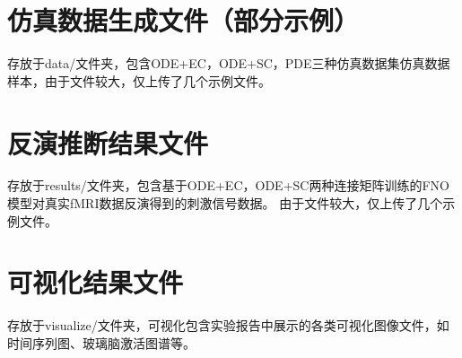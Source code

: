 \documentclass[12pt,a4paper]{article}
\begin{document}
\section{仿真数据生成文件（部分示例）}
存放于data/文件夹，包含ODE+EC，ODE+SC，PDE三种仿真数据集仿真数据样本，由于文件较大，仅上传了几个示例文件。

\section{反演推断结果文件}
存放于results/文件夹，包含基于ODE+EC，ODE+SC两种连接矩阵训练的FNO模型对真实fMRI数据反演得到的刺激信号数据。
由于文件较大，仅上传了几个示例文件。
\section{可视化结果文件}
存放于visualize/文件夹，可视化包含实验报告中展示的各类可视化图像文件，如时间序列图、玻璃脑激活图谱等。
\end{document}
